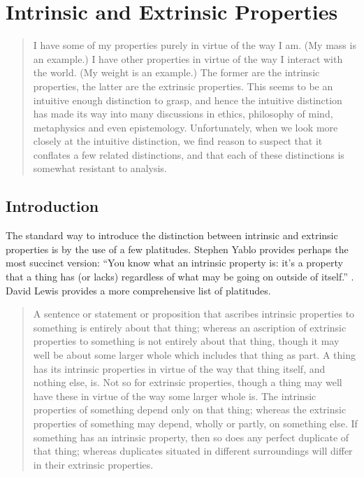 \chapter{Intrinsic and Extrinsic Properties}


\begin{quote}
I have some of my properties purely in virtue of the way I am. (My mass is an example.) I have other properties in virtue of the way I interact with the world. (My weight is an example.) The former are the intrinsic properties, the latter are the extrinsic properties. This seems to be an intuitive enough distinction to grasp, and hence the intuitive distinction has made its way into many discussions in ethics, philosophy of mind, metaphysics and even epistemology. Unfortunately, when we look more closely at the intuitive distinction, we find reason to suspect that it conflates a few related distinctions, and that each of these distinctions is somewhat resistant to analysis. 
\end{quote}

\section{Introduction}
The standard way to introduce the distinction between intrinsic and extrinsic properties is by the use of a few platitudes. Stephen Yablo provides perhaps the most succinct version: ``You know what an intrinsic property is: it's a property that a thing has (or lacks) regardless of what may be going on outside of itself.'' \citeyearpar[479]{Yablo1999}. David Lewis provides a more comprehensive list of platitudes.

\begin{quote}
A sentence or statement or proposition that ascribes intrinsic properties to something is entirely about that thing; whereas an ascription of extrinsic properties to something is not entirely about that thing, though it may well be about some larger whole which includes that thing as part. A thing has its intrinsic properties in virtue of the way that thing itself, and nothing else, is. Not so for extrinsic properties, though a thing may well have these in virtue of the way some larger whole is. The intrinsic properties of something depend only on that thing; whereas the extrinsic properties of something may depend, wholly or partly, on something else. If something has an intrinsic property, then so does any perfect duplicate of that thing; whereas duplicates situated in different surroundings will differ in their extrinsic properties. \cite[111-112 in reprint]{Lewis1983b}
\end{quote}

